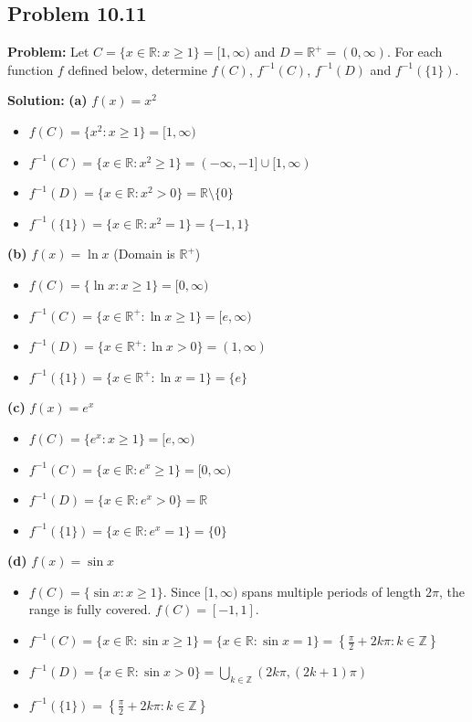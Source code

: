 \documentclass[11pt, a4paper]{article}
\theoremstyle{definition}
\theoremstyle{remark}
\newcommand{\R}{\mathbb{R}}
\newcommand{\Z}{\mathbb{Z}}
\begin{document}
\subsection{Problem 10.11}
\textbf{Problem:} Let $C = \{x \in \R : x \ge 1\} = [1, \infty)$ and $D = \R^+ = (0, \infty)$. For each function $f$ defined below, determine $f(C)$, $f^{-1}(C)$, $f^{-1}(D)$ and $f^{-1}(\{1\})$.

\textbf{Solution:}
\textbf{(a)} $f(x) = x^2$
\begin{itemize}
    \item $f(C) = \{x^2 : x \ge 1\} = [1, \infty)$
    \item $f^{-1}(C) = \{x \in \R : x^2 \ge 1\} = (-\infty, -1] \cup [1, \infty)$
    \item $f^{-1}(D) = \{x \in \R : x^2 > 0\} = \R \setminus \{0\}$
    \item $f^{-1}(\{1\}) = \{x \in \R : x^2 = 1\} = \{-1, 1\}$
\end{itemize}

\textbf{(b)} $f(x) = \ln x$ (Domain is $\R^+$)
\begin{itemize}
    \item $f(C) = \{\ln x : x \ge 1\} = [0, \infty)$
    \item $f^{-1}(C) = \{x \in \R^+ : \ln x \ge 1\} = [e, \infty)$
    \item $f^{-1}(D) = \{x \in \R^+ : \ln x > 0\} = (1, \infty)$
    \item $f^{-1}(\{1\}) = \{x \in \R^+ : \ln x = 1\} = \{e\}$
\end{itemize}

\textbf{(c)} $f(x) = e^x$
\begin{itemize}
    \item $f(C) = \{e^x : x \ge 1\} = [e, \infty)$
    \item $f^{-1}(C) = \{x \in \R : e^x \ge 1\} = [0, \infty)$
    \item $f^{-1}(D) = \{x \in \R : e^x > 0\} = \R$
    \item $f^{-1}(\{1\}) = \{x \in \R : e^x = 1\} = \{0\}$
\end{itemize}

\textbf{(d)} $f(x) = \sin x$
\begin{itemize}
    \item $f(C) = \{\sin x : x \ge 1\}$. Since $[1, \infty)$ spans multiple periods of length $2\pi$, the range is fully covered. $f(C) = [-1, 1]$.
    \item $f^{-1}(C) = \{x \in \R : \sin x \ge 1\} = \{x \in \R : \sin x = 1\} = \left\{ \frac{\pi}{2} + 2k\pi : k \in \Z \right\}$
    \item $f^{-1}(D) = \{x \in \R : \sin x > 0\} = \bigcup_{k \in \Z} (2k\pi, (2k+1)\pi)$
    \item $f^{-1}(\{1\}) = \left\{ \frac{\pi}{2} + 2k\pi : k \in \Z \right\}$
\end{itemize}
\end{document}
